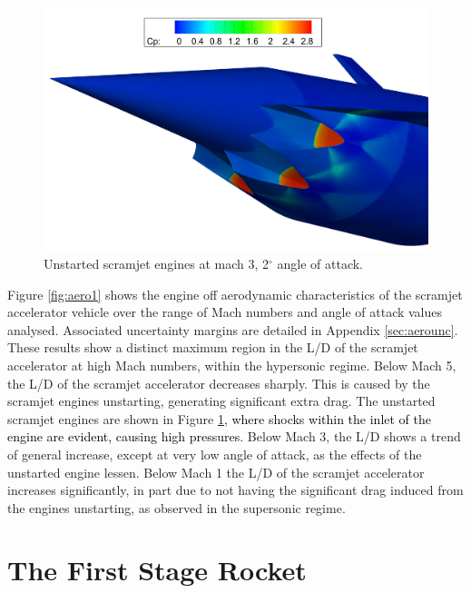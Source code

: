 \begin{figure}[ht]
	\centering
	\includegraphics[width=0.7\linewidth]{figures/3_vehicle_design/Unstart}
	\caption{Unstarted scramjet engines at mach 3, 2$^\circ$ angle of attack.}
	\label{fig:Unstart}
\end{figure}
Figure \ref{fig:aero1} shows the engine off aerodynamic characteristics of the scramjet accelerator vehicle over the range of Mach numbers and angle of attack values analysed. Associated uncertainty margins are detailed in Appendix \ref{sec:aerounc}.
These results show a distinct maximum region in the L/D of the scramjet accelerator at high Mach numbers, within the hypersonic regime. Below Mach 5, the L/D of the scramjet accelerator decreases sharply. This is caused by the scramjet engines unstarting, generating significant extra drag. The unstarted scramjet engines are shown in Figure \ref{fig:Unstart}\textcolor{black}{, where shocks within the inlet of the engine are evident, causing high pressures}. Below Mach 3,  the L/D shows a trend of general increase, except at very low angle of attack, as the effects of the unstarted engine lessen. Below Mach 1 the L/D of the scramjet accelerator increases significantly, in part due to not having the significant drag induced from the engines unstarting, as observed in the supersonic regime.  




\section{The First Stage Rocket}\label{sec:firststage}



